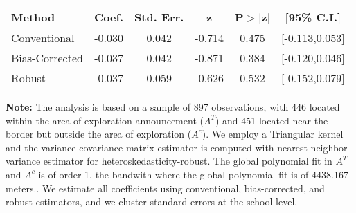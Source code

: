 \begin{table}[htbp]\centering
 \footnotesize 
\begin{tabular}{lccccc}
\hline\hline
Method & Coef. & Std. Err. & z & P$>|$z$|$ & [95\% C.I.] \\ 
\hline \hline  
Conventional & -0.030 & 0.042 & -0.714 & 0.475 & [-0.113,0.053] \\ 
 Bias-Corrected & -0.037 & 0.042 & -0.871 & 0.384 & [-0.120,0.046] \\ 
Robust & -0.037 & 0.059 & -0.626 & 0.532 & [-0.152,0.079] \\ 
  \hline\hline
\end{tabular}
\label{table:rd}
\begin{tablenotes} 
  \justifying \tiny \textbf{Note: }    
   The analysis is based on a sample of 897 observations, with 446 located within the area of exploration announcement ($A^{T}$) and 451 located near the border but outside the area of exploration  ($A^{c}$). 
           We employ a Triangular kernel and the variance-covariance matrix estimator is computed with nearest neighbor variance estimator for heteroskedasticity-robust. The global polynomial fit in  $A^{T}$ and $A^{c}$ is of order 1, the bandwith where the global polynomial fit is of 4438.167 meters.. We estimate all coefficients using conventional, bias-corrected, and robust estimators, and we cluster standard errors at the school level. \end{tablenotes} 
 \end{table} 
